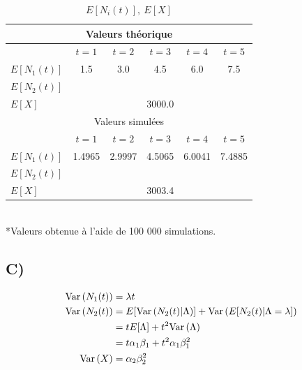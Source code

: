 \documentclass[12pt, french]{report}
\begin{document}
\begin{table}[!ht]
    \centering
    \caption{$E[N_i(t)],\: E[X]$}
    \begin{tabular}{|lccccc|}
        \hline 
        \multicolumn{6}{|c|}{Valeurs théorique} \\
        \hline
        & $t=1$ & $t=2$ & $t=3$ & $t=4$ & $t=5$ \\ 
        \hline
        $E[N_1(t)]$ & 1.5 & 3.0 & 4.5 & 6.0 & 7.5 \\ 
        $E[N_2(t)]$ &&&&& \\
        $E[X]$ & \multicolumn{5}{c|}{3000.0} \\
        \hline
        \hline 
        \multicolumn{6}{|c|}{Valeurs simulées} \\
        \hline
        & $t=1$ & $t=2$ & $t=3$ & $t=4$ & $t=5$ \\ 
        \hline
        $E[N_1(t)]$ & 1.4965 & 2.9997 & 4.5065 & 6.0041 & 7.4885 \\ 
        $E[N_2(t)]$ &&&&& \\
        $E[X]$  & \multicolumn{5}{c|}{3003.4} \\
        \hline
    \end{tabular} \\
    *Valeurs obtenue à l'aide de 100 000 simulations.
\end{table}

\subsection*{C)}

\begin{align}
    \text{Var} \left( N_1(t) \right) &= \lambda t \\
    \text{Var} \left( N_2(t) \right) &= E[\text{Var} \left( N_2(t)|\Lambda \right)] + \text{Var} \left( E[N_2(t)|\Lambda = \lambda] \right) \nonumber \\
                 &= tE[\Lambda] + t^2 \text{Var} \left( \Lambda \right) \nonumber \\
                 &= t \alpha_1 \beta_1 + t^2 \alpha_1 \beta_1^2\\
    \text{Var} \left( X \right) &= \alpha_2 \beta_2^2
\end{align}
\end{document}

